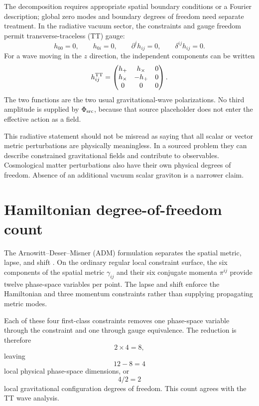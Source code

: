 \documentclass[11pt]{article}
\begin{document}
The decomposition requires appropriate spatial boundary conditions or a Fourier description; global zero modes and boundary degrees of freedom need separate treatment. In the radiative vacuum sector, the constraints and gauge freedom permit transverse-traceless (TT) gauge:
\begin{equation}
h_{00}=0,\qquad h_{0i}=0,\qquad
\partial^ih_{ij}=0,\qquad \delta^{ij}h_{ij}=0.
\label{eq:ttgauge}
\end{equation}
For a wave moving in the $z$ direction, the independent components can be written
\begin{equation}
h^{\mathrm{TT}}_{ij}=
\begin{pmatrix}
h_+&h_\times&0\\
h_\times&-h_+&0\\
0&0&0
\end{pmatrix}.
\end{equation}
The two functions are the two usual gravitational-wave polarizations. No third amplitude is supplied by $\Phi_{\mathrm{src}}$, because that source placeholder does not enter the effective action as a field.

This radiative statement should not be misread as saying that all scalar or vector metric perturbations are physically meaningless. In a sourced problem they can describe constrained gravitational fields and contribute to observables. Cosmological matter perturbations also have their own physical degrees of freedom. Absence of an additional vacuum scalar graviton is a narrower claim.

\section{Hamiltonian degree-of-freedom count}
The Arnowitt--Deser--Misner (ADM) formulation separates the spatial metric, lapse, and shift \parencite{ADM1962}. On the ordinary regular local constraint surface, the six components of the spatial metric $\gamma_{ij}$ and their six conjugate momenta $\pi^{ij}$ provide twelve phase-space variables per point. The lapse and shift enforce the Hamiltonian and three momentum constraints rather than supplying propagating metric modes.

Each of these four first-class constraints removes one phase-space variable through the constraint and one through gauge equivalence. The reduction is therefore
\begin{equation}
2\times4=8,
\label{eq:firstclassremoval}
\end{equation}
leaving
\begin{equation}
12-8=4
\label{eq:phasespacecount}
\end{equation}
local physical phase-space dimensions, or
\begin{equation}
4/2=2
\label{eq:configcount}
\end{equation}
local gravitational configuration degrees of freedom. This count agrees with the TT wave analysis.
\end{document}
